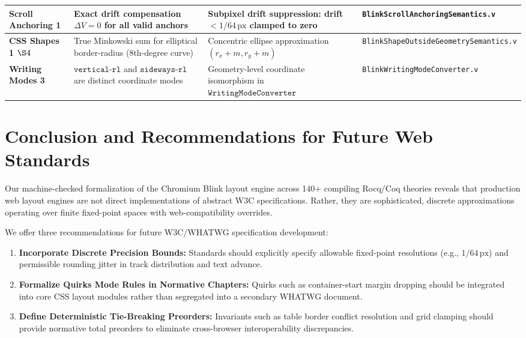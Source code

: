\documentclass[11pt,a4paper]{article}
\theoremstyle{definition}
\begin{document}
\begin{longtable}{p{2.3cm}p{3.8cm}p{4.4cm}p{4.5cm}}
\midrule
\textbf{Scroll Anchoring 1} & Exact drift compensation $\Delta V = 0$ for all valid anchors & Subpixel drift suppression: drift $< 1/64\,\text{px}$ clamped to zero & \texttt{BlinkScrollAnchoring}\allowbreak\texttt{Semantics.v} \\
\midrule
\textbf{CSS Shapes 1 $\S 4$} & True Minkowski sum for elliptical border-radius (8th-degree curve) & Concentric ellipse approximation $(r_x + m, r_y + m)$ & \texttt{BlinkShapeOutsideGeometry}\allowbreak\texttt{Semantics.v} \\
\midrule
\textbf{Writing Modes 3} & $\mathtt{vertical\text{-}rl}$ and $\mathtt{sideways\text{-}rl}$ are distinct coordinate modes & Geometry-level coordinate isomorphism in $\mathtt{WritingModeConverter}$ & \texttt{BlinkWritingModeConverter.v} \\
\end{longtable}
\endgroup

\section{Conclusion and Recommendations for Future Web Standards}

Our machine-checked formalization of the Chromium Blink layout engine across 140+ compiling Rocq/Coq theories reveals that production web layout engines are not direct implementations of abstract W3C specifications. Rather, they are sophisticated, discrete approximations operating over finite fixed-point spaces with web-compatibility overrides.

We offer three recommendations for future W3C/WHATWG specification development:
\begin{enumerate}
    \item \textbf{Incorporate Discrete Precision Bounds:} Standards should explicitly specify allowable fixed-point resolutions (e.g., $1/64\,\text{px}$) and permissible rounding jitter in track distribution and text advance.
    \item \textbf{Formalize Quirks Mode Rules in Normative Chapters:} Quirks such as container-start margin dropping should be integrated into core CSS layout modules rather than segregated into a secondary WHATWG document.
    \item \textbf{Define Deterministic Tie-Breaking Preorders:} Invariants such as table border conflict resolution and grid clamping should provide normative total preorders to eliminate cross-browser interoperability discrepancies.
\end{enumerate}
\end{document}
